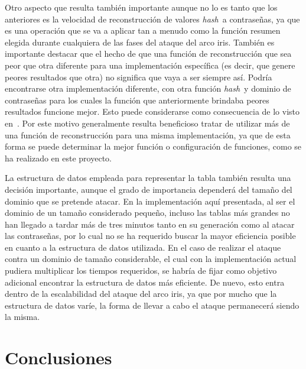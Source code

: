 \documentclass[12pt,spanish,listoffigures,listoftables,listofalgorithms]{tfgetsinf}
\newcommand{\hash}{\textit{hash}}
\begin{document}
Otro aspecto que resulta también importante aunque no lo es tanto que los anteriores es la velocidad de reconstrucción de valores \hash~a contraseñas, ya que es una operación que se va a aplicar tan a menudo como la función resumen elegida durante cualquiera de las fases del ataque del arco iris. También es importante destacar que el hecho de que una función de reconstrucción que sea peor que otra diferente para una implementación específica (es decir, que genere peores resultados que otra) no significa que vaya a ser siempre así. Podría encontrarse otra implementación diferente, con otra función \hash~y dominio de contraseñas para los cuales la función que anteriormente brindaba peores resultados funcione mejor. Esto puede considerarse como consecuencia de lo visto en~\cite{nofreelunch}. Por este motivo generalmente resulta beneficioso tratar de utilizar más de una función de reconstrucción para una misma implementación, ya que de esta forma se puede determinar la mejor función o configuración de funciones, como se ha realizado en este proyecto.

La estructura de datos empleada para representar la tabla también resulta una decisión importante, aunque el grado de importancia dependerá del tamaño del dominio que se pretende atacar. En la implementación aquí presentada, al ser el dominio de un tamaño considerado pequeño, incluso las tablas más grandes no han llegado a tardar más de tres minutos tanto en su generación como al atacar las contraseñas, por lo cual no se ha requerido buscar la mayor eficiencia posible en cuanto a la estructura de datos utilizada. En el caso de realizar el ataque contra un dominio de tamaño considerable, el cual con la implementación actual pudiera multiplicar los tiempos requeridos, se habría de fijar como objetivo adicional encontrar la estructura de datos más eficiente. De nuevo, esto entra dentro de la escalabilidad del ataque del arco iris, ya que por mucho que la estructura de datos varíe, la forma de llevar a cabo el ataque permanecerá siendo la misma.


\chapter{Conclusiones}
\end{document}
